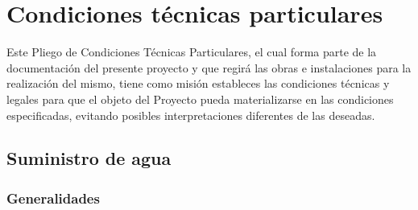 \documentclass[../main.tex]{subfiles}
\begin{document}
\section{Condiciones técnicas particulares}
Este Pliego de Condiciones Técnicas Particulares, el cual forma parte de la documentación del presente proyecto y que regirá las obras e instalaciones para la realización del mismo, tiene como misión estableces las condiciones técnicas y legales para que el objeto del Proyecto pueda materializarse en las condiciones especificadas, evitando posibles interpretaciones diferentes de las deseadas.

\subsection{Suministro de agua}
\subsubsection{Generalidades}
\end{document}
